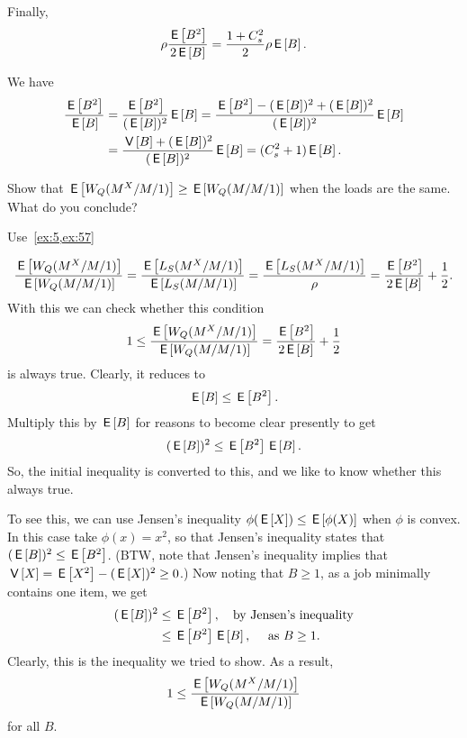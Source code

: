 \begin{extra}\label{q:batch}
Finally, 
\begin{equation*}
\rho \frac{\E{B^2}}{2\E{B}} = \frac{1+C_s^2}{2} \rho \E B.
\end{equation*}
\begin{solution}
We have
\begin{align*}
 \frac{\E{B^2}}{\E{B}}
&= \frac{\E{B^2}}{(\E B)^2} \E B 
= \frac{\E{B^2} - (\E B)^2 + (\E B)^2}{(\E B)^2} \E B \\
&= \frac{\V B + (\E B)^2}{(\E B)^2}\E B = (C_s^2+1)\E B.
\end{align*}
\end{solution}
\end{extra}


\begin{exercise}
 Show that $\E{W_Q(M^X/M/1)} \geq \E{W_Q(M/M/1)}$ when the loads are the same.
 What do you conclude?
\begin{hint}
Use~\cref{ex:5,ex:57}
\end{hint}
\begin{solution}
 \begin{equation*}
 \frac{\E{W_Q(M^X/M/1)}}{\E{W_Q(M/M/1)}} = \frac{\E{L_S(M^X/M/1)}}{\E{L_S(M/M/1)}} = \frac{\E{L_S(M^X/M/1)}}{\rho} = 
\frac{\E{B^2}}{2\E B} + \frac 12.
 \end{equation*}
With this we can check whether this condition
 \begin{equation*}
 1\leq \frac{\E{W_Q(M^X/M/1)}}{\E{W_Q(M/M/1)}} = \frac{\E{B^2}}{2\E B} + \frac 12
 \end{equation*}
 is always true. Clearly, it reduces to
\begin{equation*}
\E B \leq \E{B^2}.
\end{equation*}
Multiply this by $\E B$ for reasons to become clear presently to get
\begin{equation*}
(\E B)^2 \leq \E{B^2} \E B.
\end{equation*}
So, the initial inequality is converted to this, and we like to know
whether this always true.


To see this, we can use Jensen's inequality $\phi(\E X) \leq \E{\phi(X)}$ when $\phi$ is convex.
In this case take $\phi(x)=x^2$, so that Jensen's inequality states that $(\E B)^2 \leq \E{B^2}$.
(BTW, note that Jensen's inequality implies that $\V X = \E{X^2} - (\E X)^2\geq 0$.)
Now noting that $B\geq 1$, as a job minimally contains one item, we get
\begin{equation*}
 \begin{split}
(\E B)^2 
&\leq \E{B^2}, \quad{\text{by Jensen's inequality}} \\
&\leq \E{B^2} \E B, \quad{\text{ as } B \geq 1}.
 \end{split}
\end{equation*}
Clearly, this is the inequality we tried to show. As a result,
 \begin{equation*}
 1\leq \frac{\E{W_Q(M^X/M/1)}}{\E{W_Q(M/M/1)}}
 \end{equation*}
for all $B$. 


\end{solution}
\end{exercise}

